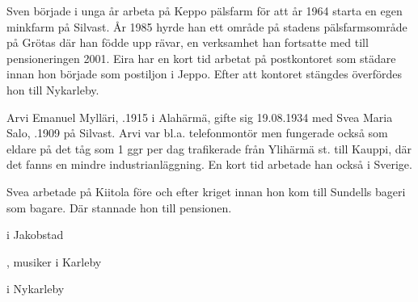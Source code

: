 Sven började i unga år arbeta på Keppo pälsfarm för att år 1964 starta en egen minkfarm på Silvast. År 1985 hyrde han ett område på stadens pälsfarmsområde på Grötas där han födde upp rävar, en verksamhet han fortsatte med till pensioneringen 2001. Eira har en kort tid arbetat på postkontoret som städare innan hon började som postiljon i Jeppo. Efter att kontoret stängdes överfördes hon till Nykarleby.
\begin{jhchildren}
  \item {}
  \item {}
\end{jhchildren}



%


%
Arvi Emanuel Mylläri, .1915 i Alahärmä, gifte sig 19.08.1934 med Svea Maria Salo, .1909 på Silvast. Arvi var bl.a. telefonmontör men fungerade också som eldare på det tåg som 1 ggr per dag trafikerade från Ylihärmä st. till Kauppi, där det fanns en mindre industrianläggning. En kort tid arbetade han också i Sverige.

Svea arbetade på Kiitola före och efter kriget innan hon kom till Sundells bageri som bagare. Där stannade hon till pensionen.
\begin{jhchildren}
  \item {} i Jakobstad
  \item {}, musiker i Karleby
  \item {} i Nykarleby
\end{jhchildren}


